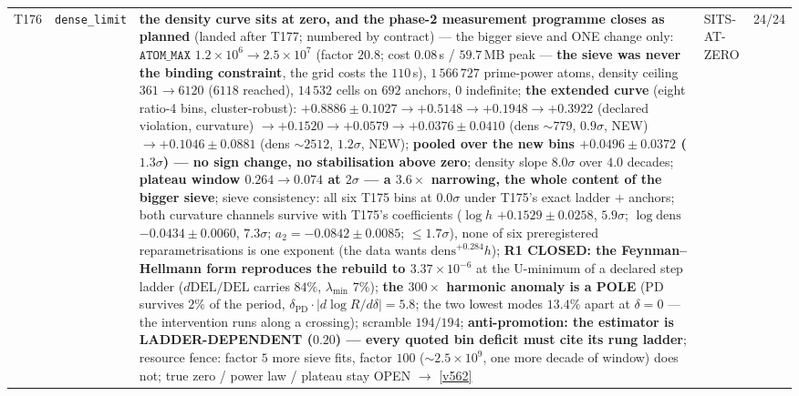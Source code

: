 \documentclass[11pt,a4paper]{article}
\begin{document}
{\begin{xltabular}{\linewidth}{@{}p{0.95cm} >{\raggedright\arraybackslash}p{3.1cm} Y >{\raggedright\scriptsize\arraybackslash}p{3.35cm} p{1.15cm}@{}}
T176 & \texttt{\scriptsize dense\_\allowbreak limit} & \textbf{the density curve sits at zero, and the phase-2 measurement programme closes as planned} (landed after T177; numbered by contract) --- the bigger sieve and ONE change only: $\mathtt{ATOM\_MAX}$ $1.2\times10^{6}\to2.5\times10^{7}$ (factor $20.8$; cost $0.08$\,s / $59.7$\,MB peak --- \textbf{the sieve was never the binding constraint}, the grid costs the $110$\,s), $1\,566\,727$ prime-power atoms, density ceiling $361\to6120$ ($6118$ reached), $14\,532$ cells on $692$ anchors, $0$ indefinite; \textbf{the extended curve} (eight ratio-4 bins, cluster-robust): $+0.8886\pm0.1027\to+0.5148\to+0.1948\to+0.3922$ (declared violation, curvature) $\to+0.1520\to+0.0579\to+0.0376\pm0.0410$ (dens ${\sim}779$, $0.9\sigma$, NEW) $\to+0.1046\pm0.0881$ (dens ${\sim}2512$, $1.2\sigma$, NEW); \textbf{pooled over the new bins $+0.0496\pm0.0372$ ($1.3\sigma$) --- no sign change, no stabilisation above zero}; density slope $8.0\sigma$ over $4.0$ decades; \textbf{plateau window $0.264\to0.074$ at $2\sigma$ --- a $3.6\times$ narrowing, the whole content of the bigger sieve}; sieve consistency: all six T175 bins at $0.0\sigma$ under T175's exact ladder $+$ anchors; both curvature channels survive with T175's coefficients ($\log h$ $+0.1529\pm0.0258$, $5.9\sigma$; $\log\mathrm{dens}$ $-0.0434\pm0.0060$, $7.3\sigma$; $a_2=-0.0842\pm0.0085$; $\le1.7\sigma$), none of six preregistered reparametrisations is one exponent (the data wants $\mathrm{dens}^{+0.284}h$); \textbf{R1 CLOSED: the Feynman--Hellmann form reproduces the rebuild to $3.37\times10^{-6}$} at the U-minimum of a declared step ladder ($d\mathrm{DEL}/\mathrm{DEL}$ carries $84\%$, $\lambda_{\min}$ $7\%$); \textbf{the $300\times$ harmonic anomaly is a POLE} (PD survives $2\%$ of the period, $\delta_{\mathrm{PD}}\cdot|d\log R/d\delta|=5.8$; the two lowest modes $13.4\%$ apart at $\delta=0$ --- the intervention runs along a crossing); scramble $194/194$; \textbf{anti-promotion: the estimator is LADDER-DEPENDENT ($0.20$) --- every quoted bin deficit must cite its rung ladder}; resource fence: factor $5$ more sieve fits, factor $100$ ($\sim2.5\times10^{9}$, one more decade of window) does not; true zero / power law / plateau stay OPEN $\to$ \vref{v562} & SITS-AT-ZERO & 24/24\\

\end{xltabular}}
\end{document}
